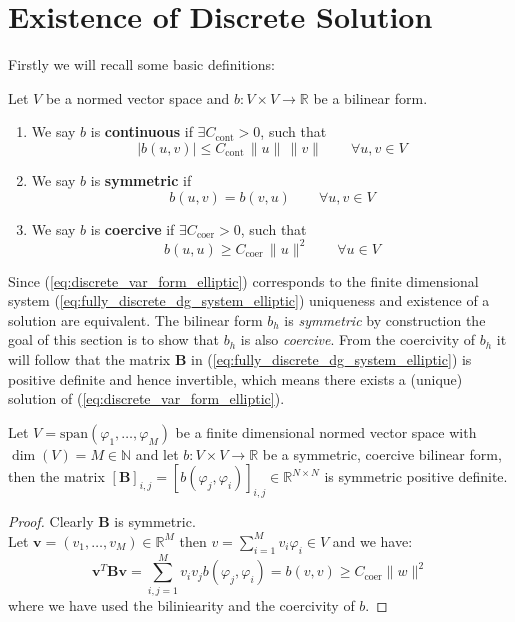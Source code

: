 \section{Existence of Discrete Solution}
\label{sec:existence_uniqueness_elliptic_discrete_problem}
Firstly we will recall some basic definitions:
\begin{definition} Let $V$ be a normed vector space and $b:V\times V \to \mathbb{R}$
	be a bilinear form.
	\begin{enumerate}[label=\textnormal{(\roman*)}]
		\item We say $b$ is \textbf{continuous} if $\exists C_{\text{cont}}>0$, such that
		      \[
			      |b(u,v)|\leq C_{\text{cont}}\, \|u\|\, \|v\| \qquad \forall u,v \in V
		      \]
		\item We say $b$ is \textbf{symmetric} if
		      \[
			      b(u,v) = b(v,u) \qquad \forall u,v \in V
		      \]
		\item We say $b$ is \textbf{coercive} if $\exists C_{\text{coer}}>0$, such that
		      \[
			      b(u,u)\geq C_{\text{coer}}\, \|u\|^2 \qquad \forall u \in V
		      \]
	\end{enumerate}
\end{definition}


Since (\ref{eq:discrete_var_form_elliptic}) corresponds to the finite dimensional
system (\ref{eq:fully_discrete_dg_system_elliptic}) uniqueness and existence of a solution
are equivalent.
The bilinear form $b_h$ is \textit{symmetric} by construction
the goal of this section is to show that $b_h$ is also \textit{coercive}.
From the coercivity of $b_h$ it will follow that the matrix $\textbf{B}$ in (\ref{eq:fully_discrete_dg_system_elliptic})
is positive definite and hence invertible, which means there exists a (unique) solution
of (\ref{eq:discrete_var_form_elliptic}).
\begin{lemma}
	Let $V = \text{span}(\varphi_1,\ldots,\varphi_M)$ be a finite dimensional
	normed vector space with $\dim(V) = M\in \mathbb{N}$ and let
	$b:V \times V \to \mathbb{R}$ be a symmetric, coercive bilinear form,
	then the matrix ${[\textbf{B}]}_{i,j} = {[b(\varphi_j, \varphi_i)]}_{i,j}\in \mathbb{R}^{N\times N}$
	is symmetric positive definite.
\end{lemma}
\begin{proof}
	Clearly $\textbf{B}$ is symmetric. \\
	Let $\textbf{v}=(v_1,\ldots,v_M)\in \mathbb{R}^M$ then $v = \sum_{i=1}^{M}
		v_i \varphi_i\in V$ and we have:
	\[
		\textbf{v}^{T}\textbf{B}\textbf{v} = \sum_{i,j=1}^{M}v_i v_j b(\varphi_j,\varphi_i) = b(v,v) \geq
		C_{\text{coer}} \|w\|^2
	\]
	where we have used the biliniearity and the coercivity of $b$.
\end{proof}

